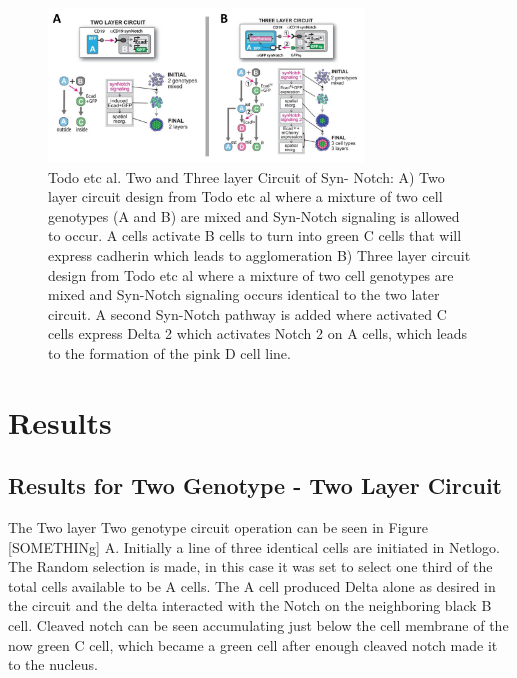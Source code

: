 \begin{figure}
\begin{center}
\includegraphics[width=8.4cm]{Todo_etc_al_layer_circuit_design}    %
\caption{Todo etc al. Two and Three layer Circuit of Syn- Notch: A) Two layer circuit design from Todo etc al where a mixture of two cell genotypes (A and B) are mixed and Syn-Notch signaling is allowed to occur. A cells activate B cells to turn into green C cells that will express cadherin which leads to agglomeration B) Three layer circuit design from Todo etc al where a mixture of two cell genotypes are mixed and Syn-Notch signaling occurs identical to the two later circuit. A second Syn-Notch pathway is added where activated C cells express Delta 2 which activates Notch 2 on A cells, which leads to the formation of the pink D cell line.  } 
\label{fig:bifurcation}
\end{center}
\end{figure}

\section{Results}

\subsection{Results for Two Genotype -  Two Layer Circuit} 

The Two layer Two genotype circuit operation can be seen in Figure [SOMETHINg] A. Initially a line of three identical cells are initiated in Netlogo. The Random selection is made, in this case it was set to select one third of the total cells available to be A cells. The A cell produced Delta alone as desired in the circuit and the delta interacted with the Notch on the neighboring black B cell. Cleaved notch can be seen accumulating just below the cell membrane of the now green C cell, which became a green cell after enough cleaved notch made it to the nucleus.

